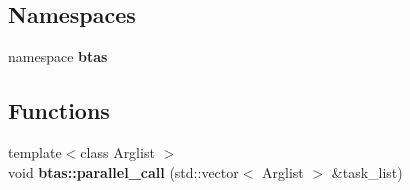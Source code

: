 \subsection*{Namespaces}
\begin{DoxyCompactItemize}
\item 
namespace {\bf btas}
\end{DoxyCompactItemize}
\subsection*{Functions}
\begin{DoxyCompactItemize}
\item 
{\footnotesize template$<$class Arglist $>$ }\\void {\bf btas\-::parallel\-\_\-call} (std\-::vector$<$ Arglist $>$ \&task\-\_\-list)
\end{DoxyCompactItemize}
